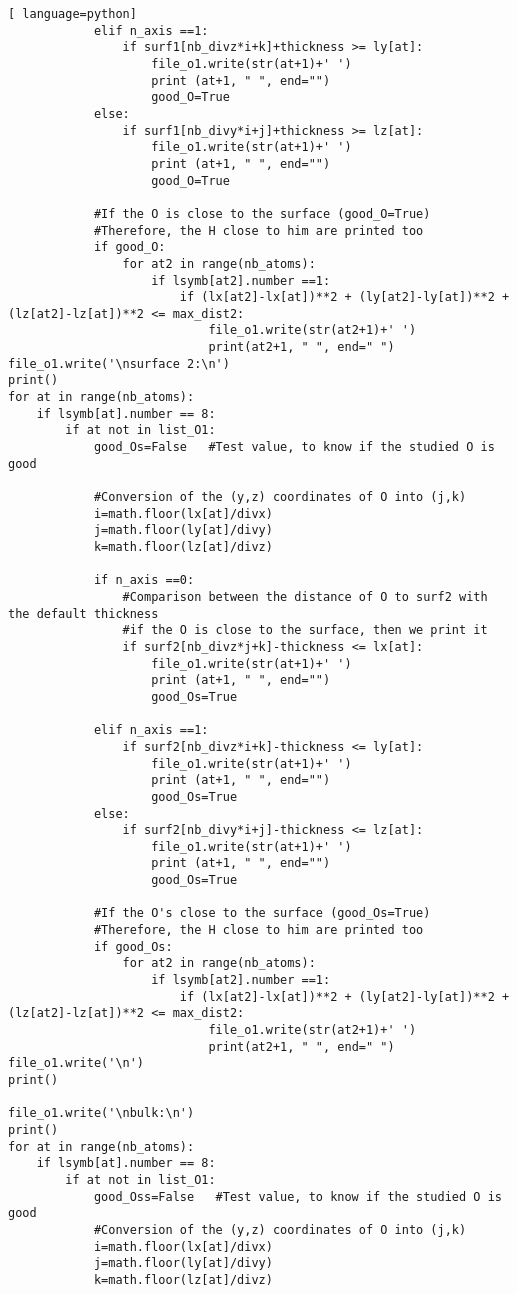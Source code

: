 \begin{lstlisting}[ language=python]
			elif n_axis ==1:
				if surf1[nb_divz*i+k]+thickness >= ly[at]:
					file_o1.write(str(at+1)+' ')
					print (at+1, " ", end="")
					good_O=True
			else:
				if surf1[nb_divy*i+j]+thickness >= lz[at]:
					file_o1.write(str(at+1)+' ')
					print (at+1, " ", end="")
					good_O=True

			#If the O is close to the surface (good_O=True)
			#Therefore, the H close to him are printed too             
			if good_O:
				for at2 in range(nb_atoms):                                    
					if lsymb[at2].number ==1: 
						if (lx[at2]-lx[at])**2 + (ly[at2]-ly[at])**2 +(lz[at2]-lz[at])**2 <= max_dist2:                                                                
							file_o1.write(str(at2+1)+' ')
							print(at2+1, " ", end=" ")
file_o1.write('\nsurface 2:\n')
print()
for at in range(nb_atoms):
	if lsymb[at].number == 8:
		if at not in list_O1:
			good_Os=False   #Test value, to know if the studied O is good 

			#Conversion of the (y,z) coordinates of O into (j,k)
			i=math.floor(lx[at]/divx)
			j=math.floor(ly[at]/divy)
			k=math.floor(lz[at]/divz)

			if n_axis ==0:
				#Comparison between the distance of O to surf2 with the default thickness
				#if the O is close to the surface, then we print it
				if surf2[nb_divz*j+k]-thickness <= lx[at]:
					file_o1.write(str(at+1)+' ')
					print (at+1, " ", end="")
					good_Os=True

			elif n_axis ==1:
				if surf2[nb_divz*i+k]-thickness <= ly[at]:
					file_o1.write(str(at+1)+' ')
					print (at+1, " ", end="")
					good_Os=True
			else:
				if surf2[nb_divy*i+j]-thickness <= lz[at]:
					file_o1.write(str(at+1)+' ')
					print (at+1, " ", end="")
					good_Os=True

			#If the O's close to the surface (good_Os=True)
			#Therefore, the H close to him are printed too             
			if good_Os:
				for at2 in range(nb_atoms):                                    
					if lsymb[at2].number ==1: 
						if (lx[at2]-lx[at])**2 + (ly[at2]-ly[at])**2 +(lz[at2]-lz[at])**2 <= max_dist2:                                                                
							file_o1.write(str(at2+1)+' ')
							print(at2+1, " ", end=" ")
file_o1.write('\n')
print()

file_o1.write('\nbulk:\n')
print()
for at in range(nb_atoms):
	if lsymb[at].number == 8:
		if at not in list_O1:
			good_Oss=False   #Test value, to know if the studied O is good 
			#Conversion of the (y,z) coordinates of O into (j,k)
			i=math.floor(lx[at]/divx)
			j=math.floor(ly[at]/divy)
			k=math.floor(lz[at]/divz)
	

\end{lstlisting}
